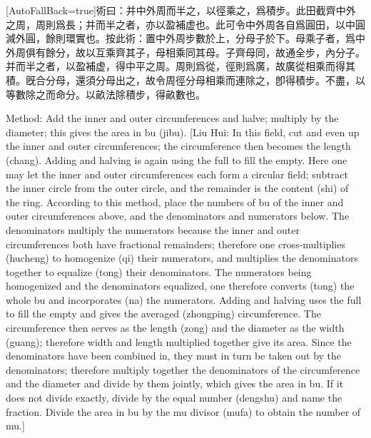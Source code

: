 \documentclass[11pt]{article}
\newcommand{\zhsmall}{\footnotesize\color{black!70}}
\newcommand{\unitlabel}[1]{\marginpar{\raggedleft\tiny\color{gray}#1}}
\newenvironment{unitzh}{\par\CJKfontspec{Noto Serif CJK SC}[AutoFallBack=true]\large\linespread{1.25}\selectfont}{\par}
\newenvironment{uniten}{\par\small\color{black!85}}{\par\medskip}
\begin{document}
\begin{unitzh}\unitlabel{jiuzhang-007.3}術曰：并中外周而半之，以徑乘之，爲積步。{\zhsmall 此田截齊中外之周，周則爲長；并而半之者，亦以盈補虚也。此可令中外周各自爲圓田，以中圓減外圓，餘則環實也。按此術：置中外周步數於上，分母子於下。母乘子者，爲中外周俱有餘分，故以互乘齊其子，母相乘同其母。子齊母同，故通全步，內分子。并而半之者，以盈補虚，得中平之周。周則爲從，徑則爲廣，故廣從相乘而得其積。旣合分母，還須分母出之，故令周徑分母相乘而連除之，卽得積步。不盡，以等數除之而命分。以畝法除積步，得畝數也。}\end{unitzh}
\begin{uniten}Method: Add the inner and outer circumferences and halve; multiply by the diameter; this gives the area in bu (jibu). [Liu Hui: In this field, cut and even up the inner and outer circumferences; the circumference then becomes the length (chang). Adding and halving is again using the full to fill the empty. Here one may let the inner and outer circumferences each form a circular field; subtract the inner circle from the outer circle, and the remainder is the content (shi) of the ring. According to this method, place the numbers of bu of the inner and outer circumferences above, and the denominators and numerators below. The denominators multiply the numerators because the inner and outer circumferences both have fractional remainders; therefore one cross-multiplies (hucheng) to homogenize (qi) their numerators, and multiplies the denominators together to equalize (tong) their denominators. The numerators being homogenized and the denominators equalized, one therefore converts (tong) the whole bu and incorporates (na) the numerators. Adding and halving uses the full to fill the empty and gives the averaged (zhongping) circumference. The circumference then serves as the length (zong) and the diameter as the width (guang); therefore width and length multiplied together give its area. Since the denominators have been combined in, they must in turn be taken out by the denominators; therefore multiply together the denominators of the circumference and the diameter and divide by them jointly, which gives the area in bu. If it does not divide exactly, divide by the equal number (dengshu) and name the fraction. Divide the area in bu by the mu divisor (mufa) to obtain the number of mu.]\end{uniten}
\end{document}
